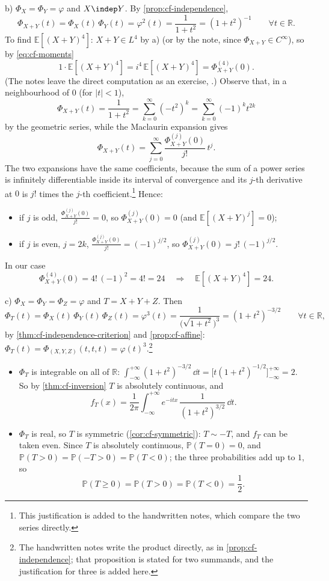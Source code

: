 \begin{example}
b) $\Phi_X=\Phi_Y=\varphi$ and $X\indep Y$. By \cref{prop:cf-independence},
\[
  \Phi_{X+Y}(t)=\Phi_X(t)\,\Phi_Y(t)=\varphi^2(t)=\frac1{1+t^2}=(1+t^2)^{-1}\qquad\forall t\in\mathbb R .
\]
To find $\mathbb E[(X+Y)^4]$: $X+Y\in L^4$ by a) (or by the note, since $\Phi_{X+Y}\in C^\infty$), so
by \eqref{eq:cf-moments}
\[
  1\cdot\mathbb E[(X+Y)^4]=i^4\,\mathbb E[(X+Y)^4]=\Phi_{X+Y}^{(4)}(0).
\]
(The notes leave the direct computation as an exercise, .) Observe
that, in a neighbourhood of $0$ (for $|t|<1$),
\[
  \Phi_{X+Y}(t)=\frac1{1+t^2}=\sum_{k=0}^\infty(-t^2)^k=\sum_{k=0}^\infty(-1)^kt^{2k}
\]
by the geometric series, while the Maclaurin expansion gives
\[
  \Phi_{X+Y}(t)=\sum_{j=0}^\infty\frac{\Phi_{X+Y}^{(j)}(0)}{j!}\,t^j .
\]
The two expansions have the same coefficients, because the sum of a power series is infinitely
differentiable inside its interval of convergence and its $j$-th derivative at $0$ is $j!$ times
the $j$-th coefficient.\footnote{This justification is added to the handwritten notes, which
compare the two series directly.} Hence:
\begin{itemize}
  \item if $j$ is odd, $\frac{\Phi_{X+Y}^{(j)}(0)}{j!}=0$, so $\Phi_{X+Y}^{(j)}(0)=0$ (and
    $\mathbb E[(X+Y)^j]=0$);
  \item if $j$ is even, $j=2k$, $\frac{\Phi_{X+Y}^{(j)}(0)}{j!}=(-1)^{j/2}$, so
    $\Phi_{X+Y}^{(j)}(0)=j!\,(-1)^{j/2}$.
\end{itemize}
In our case
\[
  \Phi_{X+Y}^{(4)}(0)=4!\,(-1)^2=4!=24\quad\Longrightarrow\quad\mathbb E[(X+Y)^4]=24 .
\]

c) $\Phi_X=\Phi_Y=\Phi_Z=\varphi$ and $T=X+Y+Z$. Then
\[
  \Phi_T(t)=\Phi_X(t)\,\Phi_Y(t)\,\Phi_Z(t)=\varphi^3(t)=\frac1{\big(\sqrt{1+t^2}\big)^3}=(1+t^2)^{-3/2}
  \qquad\forall t\in\mathbb R,
\]
by \cref{thm:cf-independence-criterion} and \cref{prop:cf-affine}:
$\Phi_T(t)=\Phi_{(X,Y,Z)}(t,t,t)=\varphi(t)^3$.\footnote{The handwritten notes write the product
directly, as in \cref{prop:cf-independence}; that proposition is stated for two summands, and the
justification for three is added here.}
\begin{itemize}
  \item $\Phi_T$ is integrable on all of $\mathbb R$:
    $\int_{-\infty}^{+\infty}(1+t^2)^{-3/2}\,\dd t=\big[t(1+t^2)^{-1/2}\big]_{-\infty}^{+\infty}=2$.
    So by \cref{thm:cf-inversion} $T$ is absolutely continuous, and
    \[
      f_T(x)=\frac1{2\pi}\int_{-\infty}^{+\infty}e^{-itx}\,\frac1{(1+t^2)^{3/2}}\,\dd t .
    \]
  \item $\Phi_T$ is real, so $T$ is symmetric (\cref{cor:cf-symmetric}): $T\sim-T$, and
    $f_T$ can be taken even. Since $T$ is absolutely continuous, $\mathbb P(T=0)=0$, and
    $\mathbb P(T>0)=\mathbb P(-T>0)=\mathbb P(T<0)$; the three probabilities add up to $1$, so
    \[
      \mathbb P(T\ge0)=\mathbb P(T>0)=\mathbb P(T<0)=\frac12 .
    \]
\end{itemize}
\end{example}

